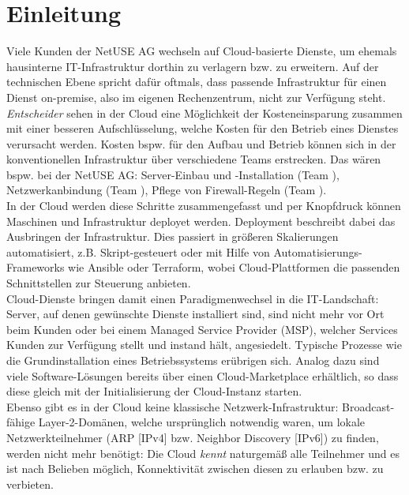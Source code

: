 \chapter{Einleitung}

Viele Kunden der NetUSE AG wechseln auf Cloud-basierte Dienste, um ehemals hausinterne IT-Infrastruktur dorthin zu verlagern bzw. zu erweitern. Auf der technischen Ebene spricht dafür oftmals, dass passende Infrastruktur für einen Dienst on-premise, also im eigenen Rechenzentrum,  nicht zur Verfügung steht. \textit{Entscheider} sehen in der Cloud eine Möglichkeit der Kosteneinsparung zusammen mit einer besseren Aufschlüsselung, welche Kosten für den Betrieb eines Dienstes verursacht werden. Kosten bspw. für den Aufbau und Betrieb können sich in der konventionellen Infrastruktur über verschiedene Teams erstrecken. Das wären bspw. bei der NetUSE AG: Server-Einbau und -Installation (Team \grqq{}), Netzwerkanbindung (Team \grqq{}), Pflege von Firewall-Regeln (Team \grqq{}).\\
In der Cloud werden diese Schritte zusammengefasst und per Knopfdruck können Maschinen und Infrastruktur deployet werden. Deployment beschreibt dabei das Ausbringen der Infrastruktur. Dies passiert in größeren Skalierungen automatisiert, z.B. Skript-gesteuert oder mit Hilfe von Automatisierungs-Frameworks wie Ansible oder Terraform, wobei Cloud-Plattformen die passenden Schnittstellen zur Steuerung anbieten\cite{edelman2018}\cite{Brikman2019}.\\
Cloud-Dienste bringen damit einen Paradigmenwechsel in die IT-Landschaft: Server, auf denen gewünschte Dienste installiert sind, sind nicht mehr vor Ort beim Kunden oder bei einem Managed Service Provider (MSP), welcher Services Kunden zur Verfügung stellt und instand hält, angesiedelt. Typische Prozesse wie die Grundinstallation eines Betriebssystems erübrigen sich. Analog dazu sind viele Software-Lösungen bereits über einen Cloud-Marketplace erhältlich, so dass diese gleich mit der Initialisierung der Cloud-Instanz starten.\\
Ebenso gibt es in der Cloud keine klassische Netzwerk-Infrastruktur: Broadcast-fähige Layer-2-Domänen, welche ursprünglich notwendig waren, um lokale Netzwerkteilnehmer (ARP [IPv4] bzw. Neighbor Discovery [IPv6]) zu finden, werden nicht mehr benötigt: Die Cloud \textit{kennt} naturgemäß alle Teilnehmer und es ist nach Belieben möglich, Konnektivität zwischen diesen zu erlauben bzw. zu verbieten.\\
